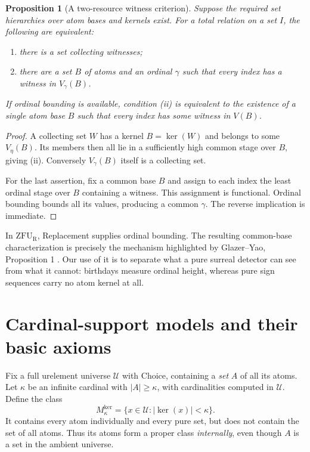 \documentclass[11pt,letterpaper]{article}
\newtheorem{proposition}[proposition]{Proposition}\aliascntresetthe{proposition}
\theoremstyle{definition}
\theoremstyle{remark}
\newcommand{\ZFUR}{\mathrm{ZFU}_{\mathrm R}}
\newcommand{\kerat}{\operatorname{ker}}
\newcommand{\Mker}{M^{\mathrm{ker}}}
\newcommand{\Uk}{\mathcal U}
\begin{document}
\begin{proposition}[A two-resource witness criterion]
\label{hset:zr:prop:tworesources}
Suppose the required set hierarchies over atom bases and kernels exist. For a total relation on a set $I$, the following are equivalent:
\begin{enumerate}[label=(\roman*)]
\item there is a set collecting witnesses;
\item there are a set $B$ of atoms and an ordinal $\gamma$ such that every index has a witness in $V_\gamma(B)$.
\end{enumerate}
If ordinal bounding is available, condition (ii) is equivalent to the existence of a single atom base $B$ such that every index has some witness in $V(B)$.
\end{proposition}
\begin{proof}
A collecting set $W$ has a kernel $B=\kerat(W)$ and belongs to some $V_\eta(B)$. Its members then all lie in a sufficiently high common stage over $B$, giving (ii). Conversely $V_\gamma(B)$ itself is a collecting set.

For the last assertion, fix a common base $B$ and assign to each index the least ordinal stage over $B$ containing a witness. This assignment is functional. Ordinal bounding bounds all its values, producing a common $\gamma$. The reverse implication is immediate.
\end{proof}

In $\ZFUR$, Replacement supplies ordinal bounding. The resulting common-base characterization is precisely the mechanism highlighted by Glazer--Yao, Proposition 1 \cite{GlazerYao}. Our use of it is to separate what a pure surreal detector can see from what it cannot: birthdays measure ordinal height, whereas pure sign sequences carry no atom kernel at all.

\section{Cardinal-support models and their basic axioms}
\label{hset:zr:sec:supportmodels}

Fix a full urelement universe $\Uk$ with Choice, containing a \emph{set} $A$ of all its atoms. Let $\kappa$ be an infinite cardinal with $|A|\geq\kappa$, with cardinalities computed in $\Uk$. Define the class
\[
\Mker_\kappa=\{x\in\Uk:|\kerat(x)|<\kappa\}.
\]
It contains every atom individually and every pure set, but does not contain the set of all atoms. Thus its atoms form a proper class \emph{internally}, even though $A$ is a set in the ambient universe.
\end{document}
